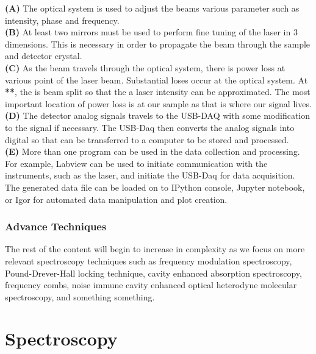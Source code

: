 \documentclass[11pt,a4paper]{book}
\begin{document}
		\noindent
		{\bfseries (A)} The optical system is used to adjust the beams various parameter such as intensity, phase and frequency.\\
		{\bfseries (B)} At least two mirrors must be used to perform fine tuning of the laser in 3 dimensions. This is necessary in order to propagate the beam through the sample and detector crystal. \\
		{\bfseries (C)} As the beam travels through the optical system, there is power loss at various point of the laser beam. Substantial loses occur at the optical system. At\\ {\bfseries ***}, the is beam split so that the a laser intensity can be approximated. The most important location of power loss is at our sample as that is where our signal lives.\\
		{\bfseries(D)} The detector analog signals travels to the USB-DAQ with some modification to the signal if necessary. The USB-Daq then converts the analog signals into digital so that can be transferred to a computer to be stored and processed. \\
		{\bfseries(E)} More than one program can be used in the data collection and processing. For example, Labview can be used to initiate communication with the instruments, such as the laser, and initiate the USB-Daq for data acquisition. The generated data file can be loaded on to IPython console, Jupyter notebook, or Igor for automated data manipulation and plot creation.		
	
	\section{Advance Techniques}
		\label{sec:Advance Techniques}
		The rest of the content will begin to increase in complexity as we focus on more relevant spectroscopy techniques such as frequency modulation spectroscopy, Pound-Drever-Hall locking technique, cavity enhanced absorption spectroscopy, frequency combs, noise immune cavity enhanced optical heterodyne molecular spectroscopy, and something something.

\part{Spectroscopy}
\end{document}

